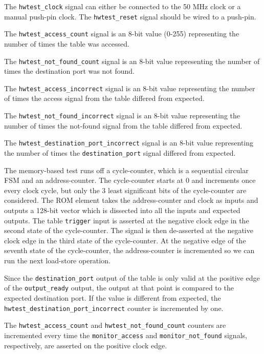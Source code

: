 \documentclass{article}
\begin{document}
The \texttt{hwtest\_clock} signal can either be connected to the 50 MHz clock or a manual push-pin clock. The \texttt{hwtest\_reset} signal should be wired to a push-pin.

The \texttt{hwtest\_access\_count} signal is an 8-bit value (0-255) representing the number of times the table was accessed.

The \texttt{hwtest\_not\_found\_count} signal is an 8-bit value representing the number of times the destination port was not found.

The \texttt{hwtest\_access\_incorrect} signal is an 8-bit value representing the number of times the access signal from the table differed from expected.

The \texttt{hwtest\_not\_found\_incorrect} signal is an 8-bit value representing the number of times the not-found signal from the table differed from expected.

The \texttt{hwtest\_destination\_port\_incorrect} signal is an 8-bit value representing the number of times the \texttt{destination\_port} signal differed from expected.

The memory-based test runs off a cycle-counter, which is a sequential circular FSM and an address-counter. The cycle-counter starts at 0 and increments once every clock cycle, but only the 3 least significant bits of the cycle-counter are considered. The ROM element takes the address-counter and clock as inputs and outputs a 128-bit vector which is dissected into all the inputs and expected outputs. The table \texttt{trigger} input is asserted at the negative clock edge in the second state of the cycle-counter. The signal is then de-asserted at the negative clock edge in the third state of the cycle-counter. At the negative edge of the seventh state of the cycle-counter, the address-counter is incremented so we can run the next load-store operation. 

Since the \texttt{destination\_port} output of the table is only valid at the positive edge of the \texttt{output\_ready} output, the output at that point is compared to the expected destination port. If the value is different from expected, the \texttt{hwtest\_destination\_port\_incorrect} counter is incremented by one.

The \texttt{hwtest\_access\_count} and \texttt{hwtest\_not\_found\_count} counters are incremented every time the \texttt{monitor\_access} and \texttt{monitor\_not\_found} signals, respectively, are asserted on the positive clock edge. 
\end{document}
